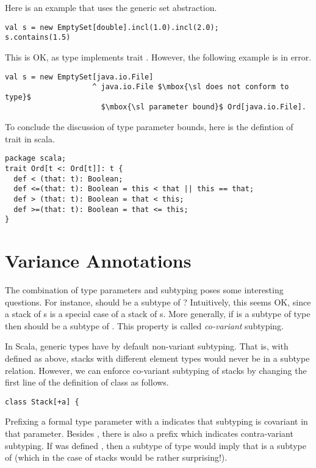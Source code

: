 \documentclass[a4paper,12pt,twoside,titlepage]{book}
\begin{document}
Here is an example that uses the generic set abstraction.
\begin{lstlisting}
val s = new EmptySet[double].incl(1.0).incl(2.0);
s.contains(1.5)
\end{lstlisting}
This is OK, as type  implements trait .
However, the following example is in error.
\begin{lstlisting}
val s = new EmptySet[java.io.File]
                    ^ java.io.File $\mbox{\sl does not conform to type}$
                      $\mbox{\sl parameter bound}$ Ord[java.io.File].
\end{lstlisting}
To conclude the discussion of type parameter
bounds, here is the defintion of trait  in scala.
\begin{lstlisting}
package scala;
trait Ord[t <: Ord[t]]: t {
  def < (that: t): Boolean;
  def <=(that: t): Boolean = this < that || this == that;
  def > (that: t): Boolean = that < this;
  def >=(that: t): Boolean = that <= this;
}
\end{lstlisting}

\section{Variance Annotations}\label{sec:first-arrays}

The combination of type parameters and subtyping poses some
interesting questions. For instance, should  be a
subtype of ? Intuitively, this seems OK, since a
stack of s is a special case of a stack of
s.  More generally, if  is a subtype of type 
then  should be a subtype of . 
This property is called {\em co-variant} subtyping.

In Scala, generic types have by default non-variant subtyping. That
is, with  defined as above, stacks with different element
types would never be in a subtype relation. However, we can enforce
co-variant subtyping of stacks by changing the first line of the
definition of class  as follows.
\begin{lstlisting}
class Stack[+a] {
\end{lstlisting}
Prefixing a formal type parameter with a \code{+} indicates that
subtyping is covariant in that parameter. 
Besides \code{+}, there is also a prefix \code{-} which indicates
contra-variant subtyping. If  was defined , then  a subtype of type  would imply
that  is a subtype of  (which in the
case of stacks would be rather surprising!).
\end{document}
